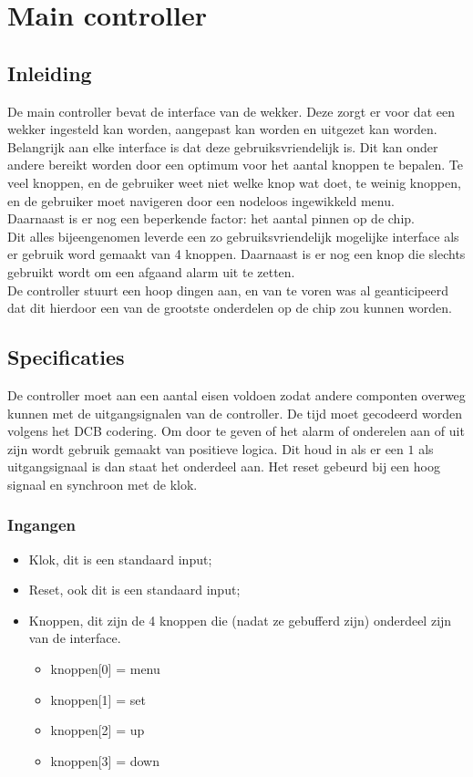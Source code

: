 \chapter{Main controller}
\section{Inleiding}
De main controller bevat de interface van de wekker. Deze zorgt er voor dat een wekker ingesteld kan worden, aangepast kan worden en uitgezet kan worden. 
Belangrijk aan elke interface is dat deze gebruiksvriendelijk is. 
Dit kan onder andere bereikt worden door een optimum voor het aantal knoppen te bepalen. 
Te veel knoppen, en de gebruiker weet niet welke knop wat doet, te weinig knoppen, en de gebruiker moet navigeren door een nodeloos ingewikkeld menu. \\
Daarnaast is er nog een beperkende factor: het aantal pinnen op de chip. \\
Dit alles bijeengenomen leverde een zo gebruiksvriendelijk mogelijke interface als er gebruik word gemaakt van 4 knoppen. Daarnaast is er nog een knop die slechts gebruikt wordt om een afgaand alarm uit te zetten. \\
De controller stuurt een hoop dingen aan, en van te voren was al geanticipeerd dat dit hierdoor een van de grootste onderdelen op de chip zou kunnen worden.

\section{Specificaties}
De controller moet aan een aantal eisen voldoen zodat andere componten overweg kunnen met de uitgangsignalen van de controller. De tijd moet gecodeerd worden volgens het DCB codering. Om door te geven of het alarm of onderelen aan of uit zijn wordt gebruik gemaakt van positieve logica. Dit houd in als er een $1$ als uitgangsignaal is dan staat het onderdeel aan. Het reset gebeurd bij een hoog signaal en synchroon met de klok.

\subsection{Ingangen}
\begin{itemize}[nolistsep]
\item Klok, dit is een standaard input;
\item Reset, ook dit is een standaard input;
\item Knoppen, dit zijn de 4 knoppen die (nadat ze gebufferd zijn) onderdeel zijn van de interface.
\begin{itemize}[nolistsep]
\item knoppen[0] = menu
\item knoppen[1] = set 
\item knoppen[2] = up
\item knoppen[3] = down\\
\end{itemize}
\end{itemize}



